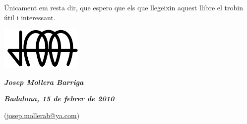    \'{U}nicament em resta dir, que espero que els que llegeixin aquest llibre el trobin
   \'{u}til i interessant.

\vspace*{1cm}
\hfill
\begin{minipage}[b]{25mm}
    \includegraphics{Imatges/Pre-Prefaci-JMB.pdf}
\end{minipage}

{\large

\hfill \textbf{\textsl{Josep Mollera Barriga}}

\hfill \textbf{\textsl{Badalona, 15 de febrer de 2010}}

\hfill (\href{mailto:jmollerab@ya.com}{\Letter\hspace{2mm}josep.mollerab@ya.com})

}
